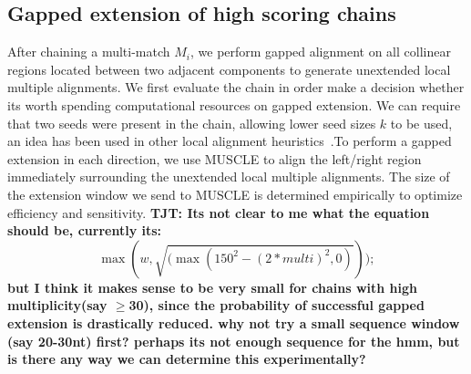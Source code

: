 \documentclass{ws-procs9x6}
\begin{document}
\subsection{Gapped extension of high scoring chains}

After chaining a multi-match $M_i$, we perform gapped alignment on all collinear regions located between two adjacent components to generate unextended local multiple alignments. We first evaluate the chain in order make a decision whether its worth spending computational resources on gapped extension. We can require that two seeds were present in the chain, allowing lower seed sizes $k$ to be used, an idea has been used in other local alignment heuristics~\cite{ref-blastz,ref-gappedblast,ref-blat}.To perform a gapped extension in each direction, we use MUSCLE to align the left/right region immediately surrounding the unextended local multiple alignments. The size of the extension window we send to MUSCLE is determined empirically to optimize efficiency and sensitivity. \textbf{TJT: Its not clear to me what the equation should be, currently its:}
\begin{equation}
 \max(w, \sqrt{(\max(150^{2}-(2*multi)^{2},0)}));
\end{equation}
\textbf{but I think it makes sense to be very small for chains with high multiplicity(say $\geq$30), since the probability of successful gapped extension is drastically reduced. why not try a small sequence window (say 20-30nt) first? perhaps its not enough sequence for the hmm, but is there any way we can determine this experimentally?}
\end{document}
